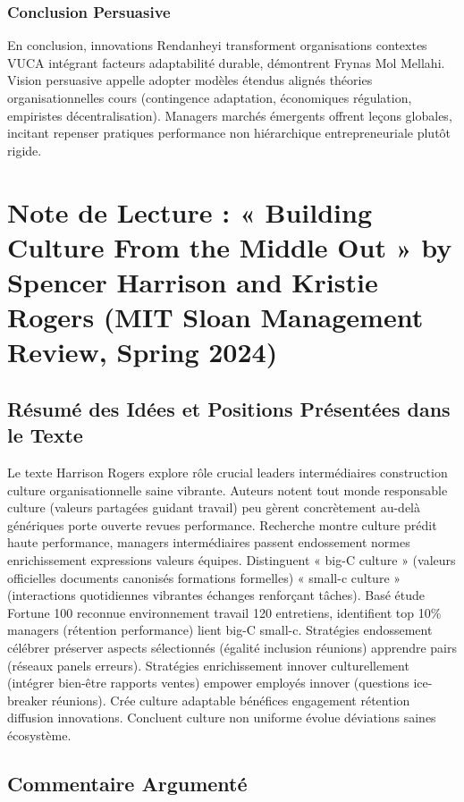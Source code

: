\documentclass[11pt]{rapportECL}
\begin{document}
\subsubsection{Conclusion Persuasive}
En conclusion, innovations Rendanheyi transforment organisations contextes VUCA intégrant facteurs adaptabilité durable, démontrent Frynas Mol Mellahi. Vision persuasive appelle adopter modèles étendus alignés théories organisationnelles cours (contingence adaptation, économiques régulation, empiristes décentralisation). Managers marchés émergents offrent leçons globales, incitant repenser pratiques performance non hiérarchique entrepreneuriale plutôt rigide.

\section{Note de Lecture : « Building Culture From the Middle Out » by Spencer Harrison and Kristie Rogers (MIT Sloan Management Review, Spring 2024)}

\subsection{Résumé des Idées et Positions Présentées dans le Texte}
Le texte Harrison Rogers explore rôle crucial leaders intermédiaires construction culture organisationnelle saine vibrante. Auteurs notent tout monde responsable culture (valeurs partagées guidant travail) peu gèrent concrètement au-delà génériques porte ouverte revues performance. Recherche montre culture prédit haute performance, managers intermédiaires passent endossement normes enrichissement expressions valeurs équipes. Distinguent « big-C culture » (valeurs officielles documents canonisés formations formelles) « small-c culture » (interactions quotidiennes vibrantes échanges renforçant tâches). Basé étude Fortune 100 reconnue environnement travail 120 entretiens, identifient top 10\% managers (rétention performance) lient big-C small-c. Stratégies endossement célébrer préserver aspects sélectionnés (égalité inclusion réunions) apprendre pairs (réseaux panels erreurs). Stratégies enrichissement innover culturellement (intégrer bien-être rapports ventes) empower employés innover (questions ice-breaker réunions). Crée culture adaptable bénéfices engagement rétention diffusion innovations. Concluent culture non uniforme évolue déviations saines écosystème.

\subsection{Commentaire Argumenté}
\end{document}
